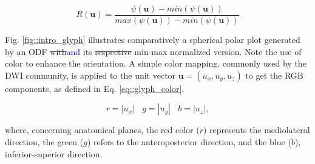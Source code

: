 \documentclass[twoside,twocolumn,10pt]{article}
\begin{document}


\begin{equation}
\label{eq::normglifo}
    R(\bm{u}) = \frac{\psi(\bm{u}) - min(\psi(\bm{u}))}{max(\psi(\bm{u})) - min(\psi(\bm{u}))}
\end{equation}

Fig. \ref{fig::intro_glyph} illustrates comparatively a spherical polar plot generated by an ODF \sout{with}\textcolor{blue}{and} its \sout{respective} min-max normalized version. Note the use of color to enhance the orientation. A simple color mapping, commonly used by the DWI community, is applied to the unit vector  $\bm{u} = (u_x, u_y, u_z)$ to get the RGB components, as defined in Eq. \ref{eq::glyph_color}.

\begin{equation}
\label{eq::glyph_color}
    r = |u_x| ~~~~ g = |u_y| ~~~~ b = |u_z|, 
\end{equation}

where, concerning anatomical planes, the red color ($r$) represents the mediolateral direction, the green ($g$) refers to the anteroposterior direction, and the blue ($b$), inferior-superior direction.
\end{document}
